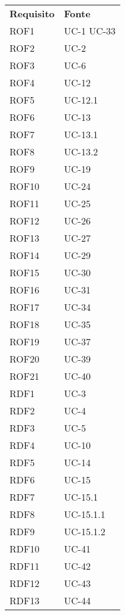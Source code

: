 \begin{longtable}{| p{5cm} | p{5cm} |}
		\rowcolor{LightBlue}
		\color{white}\bfseries Requisito & \color{white}\bfseries Fonte \\[0.25cm]
		\rowcolor{LightGray}
		ROF1 & UC-1 \newline UC-33\\
		ROF2 & UC-2\\
		\rowcolor{LightGray}
		ROF3 & UC-6\\
		ROF4 & UC-12\\
		\rowcolor{LightGray}
		ROF5 & UC-12.1\\
		ROF6 & UC-13\\
		\rowcolor{LightGray}
		ROF7 & UC-13.1\\
		ROF8 & UC-13.2\\
		\rowcolor{LightGray}
		ROF9 & UC-19\\
		ROF10 & UC-24\\
		\rowcolor{LightGray}
		ROF11 & UC-25\\
		ROF12 & UC-26\\
		\rowcolor{LightGray}
		ROF13 & UC-27\\
		ROF14 & UC-29\\
		\rowcolor{LightGray}
		ROF15 & UC-30\\
		ROF16 & UC-31\\
		\rowcolor{LightGray}
		ROF17 & UC-34\\
		ROF18 & UC-35\\
		\rowcolor{LightGray}
		ROF19 & UC-37\\
		ROF20 & UC-39\\
		\rowcolor{LightGray}
		ROF21 & UC-40\\
		RDF1 & UC-3\\
		\rowcolor{LightGray}
		RDF2 & UC-4\\
		RDF3 & UC-5\\
		\rowcolor{LightGray}
		RDF4 & UC-10\\
		RDF5 & UC-14\\
		\rowcolor{LightGray}
		RDF6 & UC-15\\
		RDF7 & UC-15.1\\
		\rowcolor{LightGray}
		RDF8 & UC-15.1.1\\
		RDF9 & UC-15.1.2\\
		\rowcolor{LightGray}
		RDF10 & UC-41\\
		RDF11 & UC-42\\
		\rowcolor{LightGray}
		RDF12 & UC-43\\
		RDF13 & UC-44\\

\end{longtable}
